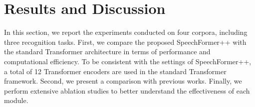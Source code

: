 \documentclass[lettersize,journal]{IEEEtran}
\begin{document}
\section{Results and Discussion}
In this section, we report the experiments conducted on four corpora, including three recognition tasks. First, we compare the proposed SpeechFormer++ with the standard Transformer architecture in terms of performance and computational efficiency. To be consistent with the settings of SpeechFormer++, a total of 12 Transformer encoders are used in the standard Transformer framework. Second, we present a comparison with previous works. Finally, we perform extensive ablation studies to better understand the effectiveness of each module.

\begin{table}[t]
    \caption{Performance and computational efficiency of Transformer and SpeechFormer++ using HuBERT features on MELD.\\Gain indicates the relative improvement (+) or reduction (-)}
    \label{tab_3}
    \centering
\end{table}
\end{document}

